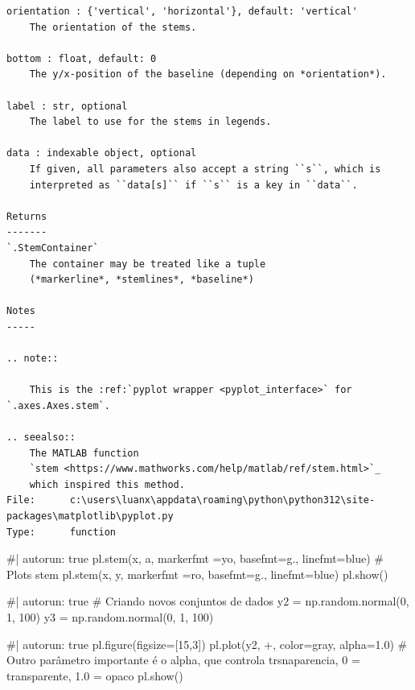\documentclass[
  letterpaper,
  DIV=11,
  numbers=noendperiod]{scrreprt}
\newenvironment{Shaded}{\begin{snugshade}}{\end{snugshade}}
\newcommand{\NormalTok}[1]{\textcolor[rgb]{0.00,0.23,0.31}{#1}}
\begin{document}
\begin{verbatim}
orientation : {'vertical', 'horizontal'}, default: 'vertical'
    The orientation of the stems.

bottom : float, default: 0
    The y/x-position of the baseline (depending on *orientation*).

label : str, optional
    The label to use for the stems in legends.

data : indexable object, optional
    If given, all parameters also accept a string ``s``, which is
    interpreted as ``data[s]`` if ``s`` is a key in ``data``.

Returns
-------
`.StemContainer`
    The container may be treated like a tuple
    (*markerline*, *stemlines*, *baseline*)

Notes
-----

.. note::

    This is the :ref:`pyplot wrapper <pyplot_interface>` for `.axes.Axes.stem`.

.. seealso::
    The MATLAB function
    `stem <https://www.mathworks.com/help/matlab/ref/stem.html>`_
    which inspired this method.
File:      c:\users\luanx\appdata\roaming\python\python312\site-packages\matplotlib\pyplot.py
Type:      function
\end{verbatim}

\begin{Shaded}
\begin{Highlighting}[]
\NormalTok{\#| autorun: true}
\NormalTok{pl.stem(x, a, markerfmt =\textquotesingle{}yo\textquotesingle{}, basefmt=\textquotesingle{}g.\textquotesingle{}, linefmt=\textquotesingle{}blue\textquotesingle{}) \# Plots stem}
\NormalTok{pl.stem(x, y, markerfmt =\textquotesingle{}ro\textquotesingle{}, basefmt=\textquotesingle{}g.\textquotesingle{}, linefmt=\textquotesingle{}blue\textquotesingle{})}
\NormalTok{pl.show()}
\end{Highlighting}
\end{Shaded}

\begin{Shaded}
\begin{Highlighting}[]
\NormalTok{\#| autorun: true}
\NormalTok{\# Criando novos conjuntos de dados}
\NormalTok{y2 = np.random.normal(0, 1, 100)}
\NormalTok{y3 = np.random.normal(0, 1, 100)}
\end{Highlighting}
\end{Shaded}

\begin{Shaded}
\begin{Highlighting}[]
\NormalTok{\#| autorun: true}
\NormalTok{pl.figure(figsize=[15,3])}
\NormalTok{pl.plot(y2, \textquotesingle{}+\textquotesingle{}, color=\textquotesingle{}gray\textquotesingle{}, alpha=1.0) \# Outro parâmetro importante é o alpha, que controla trsnaparencia, 0 = transparente, 1.0 = opaco}
\NormalTok{pl.show()}
\end{Highlighting}
\end{Shaded}
\end{document}
